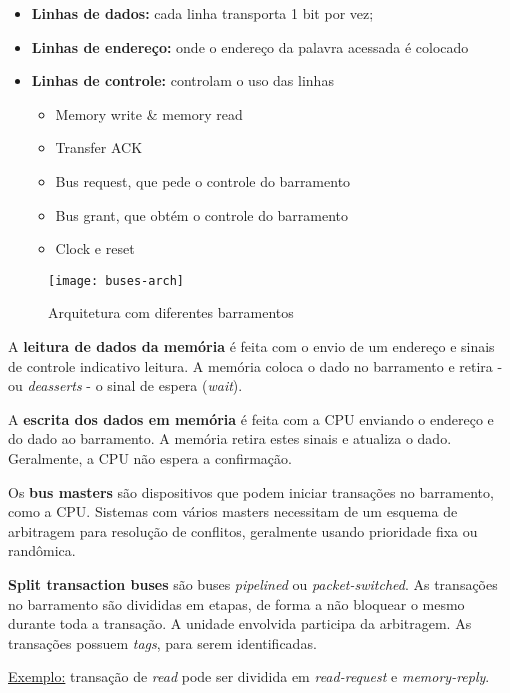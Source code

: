 \begin{itemize}
  \item \textbf{Linhas de dados:} cada linha transporta 1 bit por vez;

  \item \textbf{Linhas de endereço:} onde o endereço da palavra acessada é colocado

  \item \textbf{Linhas de controle:} controlam o uso das linhas
    \begin{itemize}
      \item Memory write \& memory read
      \item Transfer ACK
      \item Bus request, que pede o controle do barramento
      \item Bus grant, que obtém o controle do barramento
      \item Clock e reset
    \end{itemize}
\end{itemize}

\begin{figure}
  \centering
  \texttt{[image: buses-arch]}
  \label{fig:buses-arch}
  \caption{Arquitetura com diferentes barramentos}
\end{figure}

A \textbf{leitura de dados da memória} é feita com o envio de um endereço e sinais de controle indicativo leitura. A memória coloca o dado no barramento e retira - ou \textit{deasserts} - o sinal de espera (\textit{wait}).

A \textbf{escrita dos dados em memória} é feita com a CPU enviando o endereço e do dado ao barramento. A memória retira estes sinais e atualiza o dado. Geralmente, a CPU não espera a confirmação.

Os \textbf{bus masters} são dispositivos que podem iniciar transações no barramento, como a CPU. Sistemas com vários masters necessitam de um esquema de arbitragem para resolução de conflitos, geralmente usando prioridade fixa ou randômica.


\textbf{Split transaction buses} são buses \textit{pipelined} ou \textit{packet-switched}. As transações no barramento são divididas em etapas, de forma a não bloquear o mesmo durante toda a transação. A unidade envolvida participa da arbitragem. As transações possuem \textit{tags}, para serem identificadas.

\underline{Exemplo:} transação de \textit{read} pode ser dividida em \textit{read-request} e \textit{memory-reply}.



